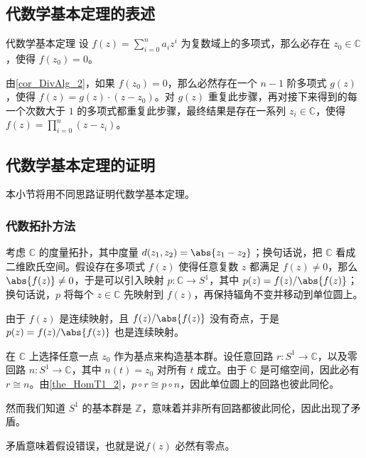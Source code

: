 
\begin{issues}
\issueTODO
\end{issues}


\subsection{代数学基本定理的表述}

\begin{definition}{代数学基本定理}\label{def_BscAlg_1}
设 $f(z)=\sum\limits_{i=0}^n a_iz^i$ 为复数域上的多项式，那么必存在 $z_0\in\mathbb{C}$，使得 $f(z_0)=0$。
\end{definition}

由\autoref{cor_DivAlg_2}，如果 $f(z_0)=0$，那么必然存在一个 $n-1$ 阶多项式 $g(z)$，使得 $f(z)=g(z)\cdot(z-z_0)$。对 $g(z)$ 重复此步骤，再对接下来得到的每一个次数大于 $1$ 的多项式都重复此步骤，最终结果是存在一系列 $z_i\in\mathbb{C}$，使得 $f(z)=\prod\limits_{i=0}^{n}(z-z_i)$。

\subsection{代数学基本定理的证明}

本小节将用不同思路证明代数学基本定理。

\subsubsection{代数拓扑方法}

考虑 $\mathbb{C}$ 的度量拓扑，其中度量 $d(z_1, z_2)=\abs{z_1-z_2}$；换句话说，把 $\mathbb{C}$ 看成二维欧氏空间。假设存在多项式 $f(z)$ 使得任意复数 $z$ 都满足 $f(z)\not=0$，那么 $\abs{f(z)}\not=0$，于是可以引入映射 $p:\mathbb{C}\rightarrow S^1$，其中 $p(z)=f(z)/\abs{f(z)}$；换句话说，$p$ 将每个 $z\in\mathbb{C}$ 先映射到 $f(z)$，再保持辐角不变并移动到单位圆上。

由于 $f(z)$ 是连续映射，且 $f(z)/\abs{f(z)}$ 没有奇点，于是 $p(z)=f(z)/\abs{f(z)}$ 也是连续映射。

在 $\mathbb{C}$ 上选择任意一点 $z_0$ 作为基点来构造基本群。设任意回路 $r:S^1\rightarrow\mathbb{C}$，以及零回路 $n:S^1\rightarrow\mathbb{C}$，其中 $n(t)=z_0$ 对所有 $t$ 成立。由于 $\mathbb{C}$ 是可缩空间，因此必有 $r\cong n$。由\autoref{the_HomT1_2}，$p\circ r\cong p\circ n$，因此单位圆上的回路也彼此同伦。

然而我们知道 $S^1$ 的基本群是 $\mathbb{Z}$，意味着并非所有回路都彼此同伦，因此出现了矛盾。

矛盾意味着假设错误，也就是说$f(z)$ 必然有零点。


